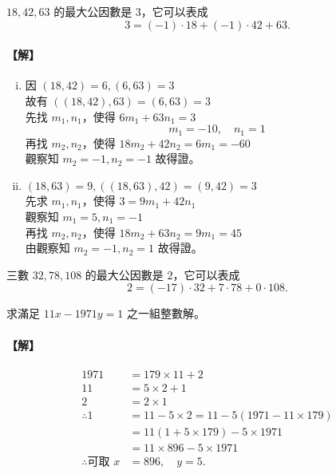 \begin{example}\label{ex:6-2-7}
$18, 42, 63$ 的最大公因數是 $3$，它可以表成
\begin{equation*}
  3 = (-1) \cdot 18 + (-1) \cdot 42 + 63.
\end{equation*}

\paragraph{【解】}
\begin{enumerate}[(i)]
  \item 因 $(18, 42) = 6, (6, 63) = 3$ \\
  故有 $((18, 42), 63) = (6, 63) = 3$ \\
  先找 $m_1, n_1$，使得 $6m_1 + 63n_1 = 3$
  \begin{equation*}
    m_1 = -10, \quad n_1 = 1
  \end{equation*}
  再找 $m_2, n_2$，使得 $18m_2 + 42n_2 = 6m_1 = -60$ \\
  觀察知 $m_2 = -1, n_2 = -1$ \hfill 故得證。
  \item $(18, 63) = 9, ((18, 63), 42) = (9, 42) = 3$ \\
  先求 $m_1, n_1$，使得 $3 = 9m_1 + 42n_1$ \\
  觀察知 $m_1 = 5, n_1 = -1$ \\
  再找 $m_2, n_2$，使得 $18m_2 + 63n_2 = 9m_1 = 45$ \\
  由觀察知 $m_2 = -1, n_2 = 1$ \hfill 故得證。
\end{enumerate}
\end{example}

\begin{example}\label{ex:6-2-8}
三數 $32, 78, 108$ 的最大公因數是 $2$，它可以表成
\begin{equation*}
  2 = (-17) \cdot 32 + 7 \cdot 78 + 0 \cdot 108.
\end{equation*}
\end{example}

\begin{example}\label{ex:6-2-9}
求滿足 $11x - 1971y = 1$ 之一組整數解。

\paragraph{【解】}
\begin{align*}
  1971 &= 179 \times 11 + 2 \\
  11 &= 5 \times 2 + 1 \\
  2 &= 2 \times 1 \\
  \therefore 1 &= 11 - 5 \times 2 = 11 - 5(1971 - 11 \times 179) \\
  &= 11(1 + 5 \times 179) - 5 \times 1971 \\
  &= 11 \times 896 - 5 \times 1971 \\
  \therefore \text{可取 } x &= 896, \quad y = 5.
\end{align*}
\end{example}

